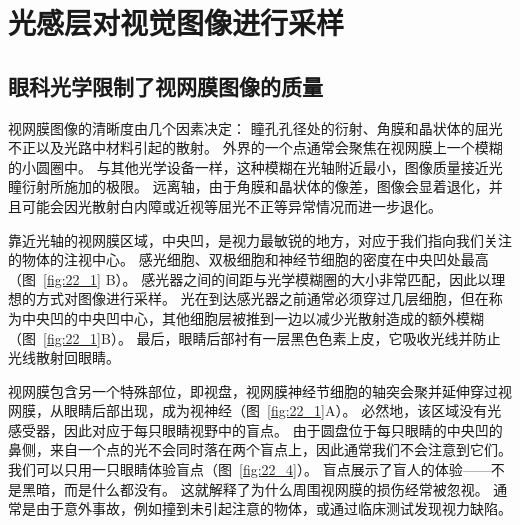 \section{光感层对视觉图像进行采样}

\subsection{眼科光学限制了视网膜图像的质量}

视网膜图像的清晰度由几个因素决定：
瞳孔孔径处的衍射、角膜和晶状体的屈光不正以及光路中材料引起的散射。
外界的一个点通常会聚焦在视网膜上一个模糊的小圆圈中。
与其他光学设备一样，这种模糊在光轴附近最小，图像质量接近光瞳衍射所施加的极限。
远离轴，由于角膜和晶状体的像差，图像会显着退化，并且可能会因光散射白内障或近视等屈光不正等异常情况而进一步退化。


靠近光轴的视网膜区域，中央凹，是视力最敏锐的地方，对应于我们指向我们关注的物体的注视中心。
感光细胞、双极细胞和神经节细胞的密度在中央凹处最高（图~\ref{fig:22_1} B）。
感光器之间的间距与光学模糊圈的大小非常匹配，因此以理想的方式对图像进行采样。
光在到达感光器之前通常必须穿过几层细胞，但在称为中央凹的中央凹中心，其他细胞层被推到一边以减少光散射造成的额外模糊（图~\ref{fig:22_1}B）。
最后，眼睛后部衬有一层黑色色素上皮，它吸收光线并防止光线散射回眼睛。


视网膜包含另一个特殊部位，即视盘，视网膜神经节细胞的轴突会聚并延伸穿过视网膜，从眼睛后部出现，成为视神经（图~\ref{fig:22_1}A）。
必然地，该区域没有光感受器，因此对应于每只眼睛视野中的盲点。
由于圆盘位于每只眼睛的中央凹的鼻侧，来自一个点的光不会同时落在两个盲点上，因此通常我们不会注意到它们。
我们可以只用一只眼睛体验盲点（图~\ref{fig:22_4}）。
盲点展示了盲人的体验——不是黑暗，而是什么都没有。 
这就解释了为什么周围视网膜的损伤经常被忽视。
通常是由于意外事故，例如撞到未引起注意的物体，或通过临床测试发现视力缺陷。


